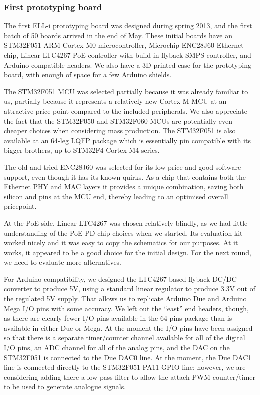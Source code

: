 \documentclass[final]{siamltex}
\begin{document}
\subsubsection{First prototyping board}

The first ELL-i prototyping board was designed during spring 2013, and
the first batch of 50 boards arrived in the end of May.  These initial
boards have an STM32F051\cite{STM32F051} ARM Cortex-M0
microcontroller, Microchip ENC28J60\cite{ENC28J60} Ethernet chip,
Linear LTC4267 PoE controller with build-in flyback SMPS controller,
and Arduino-compatible headers.  We also have a 3D printed case for
the prototyping board, with enough of space for a few Arduino shields.

The STM32F051 MCU was selected partially because it was already
familiar to us, partially because it represents a relatively new
Cortex-M MCU at an attractive price point compared to the included
peripherals.  We also appreciate the fact that the STM32F050 and
STM32F060 MCUs are potentially even cheaper choices when considering
mass production.  The STM32F051 is also available at an 64-leg LQFP
package which is essentially pin compatible with its bigger brothers,
up to STM32F4 Cortex-M4 series.

The old and tried ENC28J60 was selected for its low price and good
software support, even though it has its known quirks.  As a chip that
contains both the Ethernet PHY and MAC layers it provides a unique
combination, saving both silicon and pins at the MCU end, thereby
leading to an optimised overall pricepoint.

At the PoE side, Linear LTC4267 was chosen relatively blindly, as we
had little understanding of the PoE PD chip choices when we started.
Its evaluation kit worked nicely and it was easy to copy the
schematics for our purposes.  At it works, it appeared to be a good
choice for the initial design.  For the next round, we need to
evaluate more alternatives.

For Arduino-compatibility, we designed the LTC4267-based flyback DC/DC
converter to produce 5V, using a standard linear regulator to produce
3.3V out of the regulated 5V supply.  That allows us to replicate
Arduino Due and Arduino Mega I/O pins with some accuracy.  We left out
the ``east'' end headers, though, as there are clearly fewer I/O pins
available in the 64-pins package than is available in either Due or
Mega.  At the moment the I/O pins have been assigned so that there is
a separate timer/counter channel available for all of the digital I/O
pins, an ADC channel for all of the analog pins, and the DAC on the
STM32F051 is connected to the Due DAC0 line.  At the moment, the Due
DAC1 line is connected directly to the STM32F051 PA11 GPIO line;
however, we are considering adding there a low pass filter to allow
the attach PWM counter/timer to be used to generate analogue signals.
\end{document}
